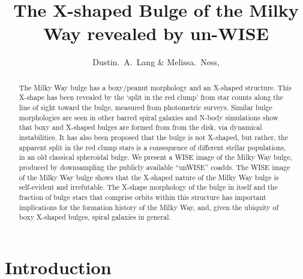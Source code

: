 \documentclass[12pt, preprint]{aastex}
\begin{document}
\title{The X-shaped Bulge of the Milky Way revealed by un-WISE} 
\author{%
Dustin.~A.~Lang \& 
Melissa.~Ness,
}
%
\begin{abstract}%
The Milky Way bulge has a boxy/peanut morphology and an X-shaped structure. This X-shape has been revealed by the `split in the red clump' from 
star counts along the line of sight toward the bulge, measured from photometric surveys. Similar bulge morphologies are seen in other barred spiral galaxies and N-body simulations show that boxy and X-shaped bulges are formed from from the disk, via dynamical instabilities.  It has also been proposed that the bulge is not X-shaped, but rather, the apparent split in the red clump stars is a consequence of different stellar populations, in an old classical spheroidal bulge. We present a WISE image of the Milky Way bulge, produced by downsampling the publicly available ``unWISE'' coadds. The WISE image of the Milky Way bulge shows that the X-shaped nature of the Milky Way bulge is self-evident and irrefutable. The X-shape morphology of the bulge in itself and the fraction of bulge stars that comprise orbits within this structure has important implications for the formation history of the Milky Way, and, given the ubiquity of boxy X-shaped bulges, spiral galaxies in general. 
\end{abstract}



\keywords{%
}

\section{Introduction}\label{sec:Intro}
\end{document}
